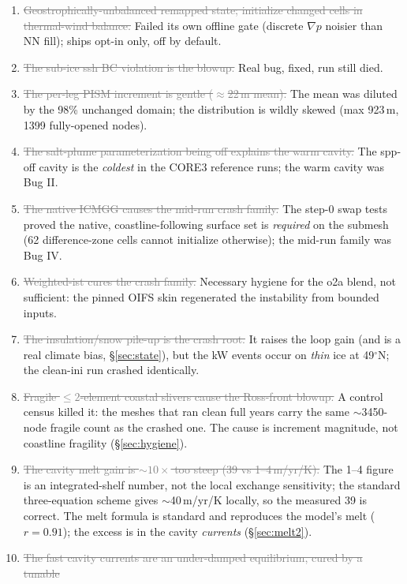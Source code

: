 \documentclass[11pt,a4paper]{article}
\newcommand{\dead}[1]{\textcolor{gray}{\sout{#1}}}
\begin{document}
\begin{enumerate}
\item \dead{Geostrophically-unbalanced remapped state; initialize changed cells in thermal-wind
  balance.} Failed its own offline gate (discrete $\nabla p$ noisier than NN fill); ships opt-in
  only, off by default.
\item \dead{The sub-ice ssh BC violation is the blowup.} Real bug, fixed, run still died.
\item \dead{The per-leg PISM increment is gentle ($\approx$22\,m mean).} The mean was diluted by the
  98\% unchanged domain; the distribution is wildly skewed (max 923\,m, 1399 fully-opened nodes).
\item \dead{The salt-plume parameterization being off explains the warm cavity.} The spp-off cavity
  is the \emph{coldest} in the CORE3 reference runs; the warm cavity was Bug II.
\item \dead{The native ICMGG causes the mid-run crash family.} The step-0 swap tests proved the
  native, coastline-following surface set is \emph{required} on the submesh (62 difference-zone
  cells cannot initialize otherwise); the mid-run family was Bug IV.
\item \dead{Weighted-ist cures the crash family.} Necessary hygiene for the o2a blend, not
  sufficient: the pinned OIFS skin regenerated the instability from bounded inputs.
\item \dead{The insulation/snow pile-up is the crash root.} It raises the loop gain (and is a real
  climate bias, \S\ref{sec:state}), but the kW events occur on \emph{thin} ice at 49$^\circ$N; the
  clean-ini run crashed identically.
\item \dead{Fragile $\le2$-element coastal slivers cause the Ross-front blowup.} A control
  census killed it: the meshes that ran clean full years carry the same $\sim$3450-node
  fragile count as the crashed one. The cause is increment magnitude, not coastline
  fragility (\S\ref{sec:hygiene}).
\item \dead{The cavity melt gain is $\sim10\times$ too steep (39 vs 1--4\,m/yr/K).} The
  1--4 figure is an integrated-shelf number, not the local exchange sensitivity; the standard
  three-equation scheme gives $\sim$40\,m/yr/K locally, so the measured 39 is correct. The
  melt formula is standard and reproduces the model's melt ($r=0.91$); the excess is in the
  cavity \emph{currents} (\S\ref{sec:melt2}).
\item \dead{The fast cavity currents are an under-damped equilibrium, cured by a tunable
}
\end{enumerate}
\end{document}
